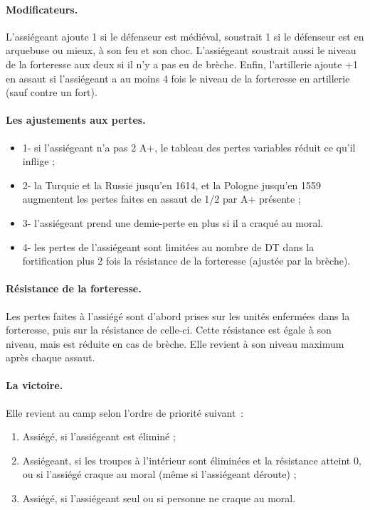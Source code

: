 \paragraph{Modificateurs.}
L'assiégeant ajoute 1 si le défenseur est médiéval, soustrait 1 si le défenseur est en arquebuse 
ou mieux, à son feu et son choc.
L'assiégeant soustrait aussi le niveau de la forteresse aux deux si il n'y a pas eu de
brèche. Enfin, l'artillerie ajoute  +1 en assaut si l'assiégeant a au moins
4 fois le niveau de la forteresse en artillerie (sauf contre un fort).

\paragraph{Les ajustements aux pertes.} 
\begin{itemize}
\item 1- si l'assiégeant n'a pas 2 A+, le tableau des pertes variables réduit
ce qu'il inflige ;
\item 2- la Turquie et la Russie jusqu'en 1614, et la Pologne jusqu'en 1559 augmentent
les pertes faites en assaut de 1/2 par A+ présente ;
\item 3- l'assiégeant prend une demie-perte en plus si il a craqué au moral.
\item 4- les pertes de l'assiégeant sont limitées au nombre de DT dans la
fortification plus 2 fois la résistance de
la forteresse (ajustée par la brèche).  
\end{itemize}

\paragraph{Résistance de la forteresse.}
Les pertes faites à l'assiégé sont d'abord prises sur les unités enfermées dans
la forteresse, puis sur la résistance de celle-ci. Cette résistance est égale à
son niveau, mais est réduite en cas de brèche. Elle revient à son niveau
maximum après chaque assaut.

\paragraph{La victoire.} Elle revient au camp selon l'ordre de priorité suivant~:
\begin{enumerate}
\item Assiégé, si l'assiégeant est éliminé ;
\item Assiégeant, si les troupes à l'intérieur sont éliminées et la résistance atteint 0, 
ou si l'assiégé craque au moral 
(même si l'assiégeant déroute) ;
\item Assiégé, si l'assiégeant seul ou si personne ne craque au moral.
\end{enumerate}


